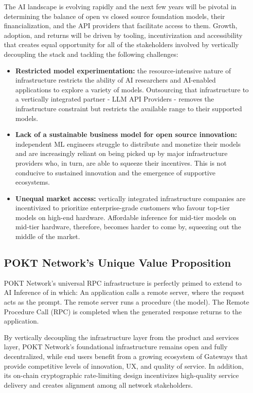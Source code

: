 \documentclass[conference,compsoc]{IEEEtran}
\begin{document}
The AI landscape is evolving rapidly and the next few years will be pivotal in determining the balance of open vs closed source foundation models, their financialization, and the API providers that facilitate access to them. Growth, adoption, and returns will be driven by tooling, incentivization and accessibility that creates equal opportunity for all of the stakeholders involved by vertically decoupling the stack and tackling the following challenges:
\begin{itemize}
    \item \textbf{Restricted model experimentation:} the resource-intensive nature of infrastructure restricts the ability of AI researchers and AI-enabled applications to explore a variety of models. Outsourcing that infrastructure to a vertically integrated partner - LLM API Providers - removes the infrastructure constraint but restricts the available range to their supported models. 
    \item \textbf{Lack of a sustainable business model for open source innovation:} independent ML engineers struggle to distribute and monetize their models and are increasingly reliant on being picked up by major infrastructure providers who, in turn, are able to squeeze their incentives. This is not conducive to sustained innovation and the emergence of supportive ecosystems.
    \item \textbf{Unequal market access:} vertically integrated infrastructure companies are incentivized to prioritize enterprise-grade customers who favour top-tier models on high-end hardware. Affordable inference for mid-tier models on mid-tier hardware, therefore, becomes harder to come by, squeezing out the middle of the market.
\end{itemize}

\subsection{POKT Network’s Unique Value Proposition}

POKT Network’s universal RPC infrastructure is perfectly primed to extend to AI Inference of in which:
An application calls a remote server, where the request acts as the prompt.
The remote server runs a procedure (the model).
The Remote Procedure Call (RPC) is completed when the generated response returns to the application.

By vertically decoupling the infrastructure layer from the product and services layer, POKT Network’s foundational infrastructure remains open and fully decentralized, while end users benefit from a growing ecosystem of Gateways that provide competitive levels of innovation, UX, and quality of service. In addition, its on-chain cryptographic rate-limiting design incentivizes high-quality service delivery and creates alignment among all network stakeholders. 
\end{document}
